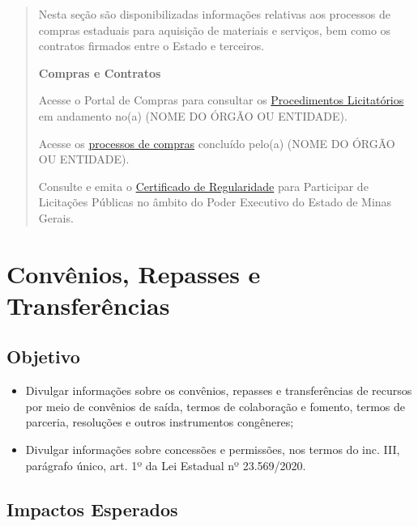 \documentclass[]{book}
\providecommand{\tightlist}{%
  \setlength{\itemsep}{0pt}\setlength{\parskip}{0pt}}
\begin{document}
\begin{quote}
Nesta seção são disponibilizadas informações relativas aos processos de compras estaduais para aquisição de materiais e serviços, bem como os contratos firmados entre o Estado e terceiros.

\textbf{Compras e Contratos}

Acesse o Portal de Compras para consultar os \href{http://compras.mg.gov.br/}{Procedimentos Licitatórios} em andamento no(a) (NOME DO ÓRGÃO OU ENTIDADE).

Acesse os \href{http://www.transparencia.mg.gov.br/compras-e-patrimonio/compras-e-contratos}{processos de compras} concluído pelo(a) (NOME DO ÓRGÃO OU ENTIDADE).

Consulte e emita o \href{https://www.cagef.mg.gov.br/fornecedor-web/br/gov/prodemge/seplag/fornecedor/publico/index.zul}{Certificado de Regularidade} para Participar de Licitações Públicas no âmbito do Poder Executivo do Estado de Minas Gerais.
\end{quote}

\hypertarget{convuxeanios-repasses-e-transferuxeancias}{%
\section{Convênios, Repasses e Transferências}\label{convuxeanios-repasses-e-transferuxeancias}}

\hypertarget{objetivo-6}{%
\subsection{Objetivo}\label{objetivo-6}}

\begin{itemize}
\tightlist
\item
  Divulgar informações sobre os convênios, repasses e transferências de recursos por meio de convênios de saída, termos de colaboração e fomento, termos de parceria, resoluções e outros instrumentos congêneres;
\item
  Divulgar informações sobre concessões e permissões, nos termos do inc. III, parágrafo único, art. 1º da Lei Estadual nº 23.569/2020.
\end{itemize}

\hypertarget{impactos-esperados-7}{%
\subsection{Impactos Esperados}\label{impactos-esperados-7}}
\end{document}
